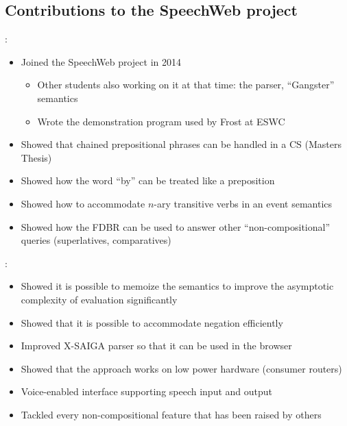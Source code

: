\documentclass[logoontitle,tabu,supertabular,aspectratio=43]{preney-uwindsor-beamer}
\begin{document}
    \subsection{Contributions to the SpeechWeb project}
    \begin{frame}{\insertsection: \insertsubsection}
    \begin{itemize}
		\item Joined the SpeechWeb project in 2014
        \begin{itemize}
            \item Other students also working on it at that time: the parser, ``Gangster'' semantics
            \item Wrote the demonstration program used by Frost at ESWC
        \end{itemize}
        \item Showed that chained prepositional phrases can be handled in a CS (Masters Thesis) \cite{peelar2016accommodating}
        \item Showed how the word ``by'' can be treated like a preposition
        \item Showed how to accommodate $n$-ary transitive verbs in an event semantics
        \item Showed how the FDBR can be used to answer other ``non-compositional'' queries (superlatives, comparatives)
    \end{itemize}
    \end{frame}

    \begin{frame}{\insertsection: \insertsubsection}
    \begin{itemize}
        \item Showed it is possible to memoize the semantics to improve the asymptotic complexity of evaluation significantly \cite{peelar2020webistjournal}
        \item Showed that it is possible to accommodate negation efficiently
        \item Improved X-SAIGA parser so that it can be used in the browser
        \item Showed that the approach works on low power hardware (consumer routers)
        \item Voice-enabled interface supporting speech input and output
        \item Tackled every non-compositional feature that has been raised by others
    \end{itemize}
    \end{frame}
\end{document}
